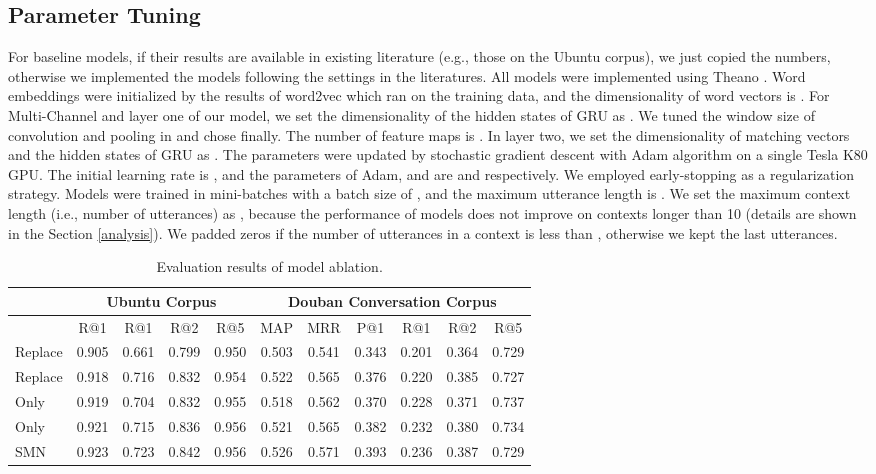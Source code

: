 \documentclass[11pt,a4paper]{article}
\newcommand{\thickhline}{\noalign{\hrule height 1pt}}
\begin{document}
	\subsection{Parameter Tuning}
	For baseline models, if their results are available in existing literature (e.g., those on the Ubuntu corpus), we just copied the numbers, otherwise we implemented the models following the settings in the literatures. All models were implemented using Theano  \cite{2016arXiv160502688short}. Word embeddings were initialized by the results of word2vec \cite{mikolov2013distributed} which ran on the training data, and the dimensionality of word vectors is . For Multi-Channel and layer one of our model, we set the dimensionality of the hidden states of GRU as . We tuned the window size of convolution and pooling in  and chose   finally. The number of feature maps is .  In layer two, we set the dimensionality of matching vectors and the hidden states of GRU as . The parameters were updated by stochastic gradient descent with Adam algorithm \cite{kingma2014adam} on a single Tesla K80 GPU. The initial learning rate is , and the parameters of Adam,  and  are  and  respectively. We employed early-stopping as a regularization strategy. Models were trained in mini-batches with a batch size of , and the maximum utterance length is . We set the maximum context length (i.e., number of utterances) as , because the performance of models does not improve on contexts longer than 10 (details are shown in the Section \ref{analysis}). We padded zeros if the  number of utterances in a context is less than , otherwise we kept the last  utterances. 
	\begin{table*}[h!] \vspace{-2mm} \small
		
		\centering
		\begin{tabular}{l|c|c|c|c|c|c|c|c|c|c}
			\thickhline &   \multicolumn{4}{c|}{\textbf{Ubuntu Corpus}}    &        \multicolumn{6}{c}{\textbf{Douban Conversation Corpus}}        \\ \hline
			&  R@1      &  R@1 &  R@2&  R@5 &MAP&MRR&P@1 &  R@1 &  R@2&  R@5  \\ \hline
Replace & 0.905 & 0.661 & 0.799 & 0.950 & 0.503 &0.541 &0.343&0.201&0.364&0.729\\ 
			Replace & 0.918 & 0.716 & 0.832 & 0.954 & 0.522&0.565 &0.376&0.220&0.385&0.727\\  \hline
			Only  & 0.919 & 0.704 & 0.832 & 0.955 & 0.518 &0.562 &0.370&0.228&0.371&0.737\\ 
			Only & 0.921 & 0.715 & 0.836 & 0.956 & 0.521 & 0.565 &0.382&0.232&0.380&0.734\\ \hline				
			SMN & 0.923 & 0.723 & 0.842 & 0.956 &0.526&0.571&0.393&0.236&0.387&0.729\\ \hline
		\end{tabular}
		\caption{Evaluation results of model ablation. \label{exp:discuss}}	
	\end{table*}
\end{document}
